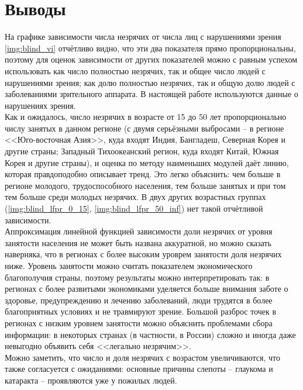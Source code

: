 \documentclass[main.tex]{subfiles}
\begin{document}
\section{Выводы}
На графике зависимости числа незрячих от числа лиц с нарушениями зрения \ref{img:blind_vi} отчётливо видно, что эти два показателя прямо пропорциональны, поэтому для оценок зависимости от других показателей можно с равным успехом использовать как число полностью незрячих, так и общее число людей с нарушениями зрения; как долю полностью незрячих, так и общую долю людей с заболеваниями зрительного аппарата. В настоящей работе используются данные о нарушениях зрения.\\
Как и ожидалось, число незрячих в возрасте от 15 до 50 лет пропорционально числу занятых в данном регионе (с двумя серьёзными выбросами -- в регионе <<Юго-восточная Азия>>, куда входят Индия, Бангладеш, Северная Корея и другие страны; Западный Тихоокеанский регион, куда входят Китай, Южная Корея и другие страны), и оценка по методу наименьших модулей даёт линию, которая правдоподобно описывает тренд. Это легко объяснить: чем больше в регионе молодого, трудоспособного населения, тем больше занятых и при том тем больше среди молодых незрячих. В двух других возрастных группах (\ref{img:blind_lfpr_0_15}, \ref{img:blind_lfpr_50_inf}) нет такой отчётливой зависимости.\\
Аппроксимация линейной функцией зависимости доли незрячих от уровня занятости населения не может быть названа аккуратной, но можно сказать наверняка, что в регионах с более высоким уроврем занятости доля незрячих ниже. Уровень занятости можно считать показателем экономического благополучия страны, поэтому результаты можно интерпретировать так: в регионах с более развитыми экономиками уделяется больше внимания заботе о здоровье, предупреждению и лечению заболеваний, люди трудятся в более благоприятных условиях и не травмируют зрение. Большой разброс точек в регионах с низким уровнем занятости можно объяснить проблемами сбора информации: в некоторых странах (в частности, в России) сложно и иногда даже невыгодно объявить себя <<легально незрячим>>.\\
Можно заметить, что число и доля незрячих с возрастом увеличиваются, что также согласуется с ожиданиями: основные причины слепоты -- глаукома и катаракта -- проявляются уже у пожилых людей.
\end{document}
